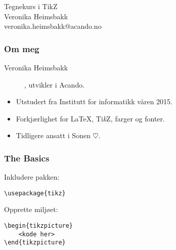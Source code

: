 \documentclass{beamer}
\begin{document}
\begin{frame}
\begin{center}
\Huge{Tegnekurs i TikZ} \\
\vspace{10pt}
\Large{Veronika Heimsbakk}\\
veronika.heimsbakk@acando.no
\end{center}
\end{frame}

\begin{frame}\frametitle{Om meg}
\begin{description}
\item[Veronika Heimsbakk], utvikler i Acando.
\end{description}

\begin{itemize}
	\item
	Utstudert fra Institutt for informatikk våren 2015.
	\item
	Forkjærlighet for \LaTeX{}, Ti\textit{k}Z, farger og fonter.
	\item
	Tidligere ansatt i Sonen $\heartsuit$.
\end{itemize}
\end{frame}

\begin{frame}[fragile]
\frametitle{The Basics}

Inkludere pakken:
\begin{Verbatim}[fontsize=\small]
\usepackage{tikz}
\end{Verbatim}

\vspace{20pt}

Opprette miljøet:
\begin{Verbatim}[fontsize=\small]
\begin{tikzpicture}
    <kode her>
\end{tikzpicture}
\end{Verbatim}

\end{frame}
\end{document}
